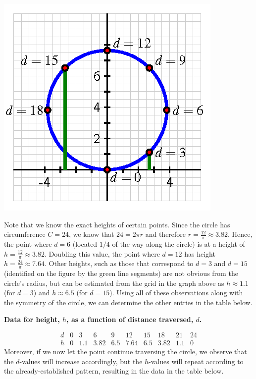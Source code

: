 \documentclass[nooutcomes, noauthor]{ximera}
\begin{document}
\begin{image}
\includegraphics{traversing-first-example.png}
\end{image}

Note that we know the exact heights of certain points.  Since the circle has circumference \(C = 24\), we know that \(24 = 2\pi r\) and therefore \(r = \frac{12}{\pi} \approx 3.82\).  Hence, the point where \(d = 6\) (located \(1/4\) of the way along the circle) is at a height of \(h = \frac{12}{\pi} \approx 3.82\).  Doubling this value, the point where \(d = 12\) has height \(h = \frac{24}{\pi} \approx 7.64\).  Other heights, such as those that correspond to \(d = 3\) and \(d = 15\) (identified on the figure by the green line segments) are not obvious from the circle's radius, but can be estimated from the grid in the graph above as \(h \approx 1.1\) (for \(d = 3\)) and \(h \approx 6.5\) (for \(d = 15\)).  Using all of these observations along with the symmetry of the circle, we can determine the other entries in the table below.

\begin{center}
\textbf{Data for height, \(h\), as a function of distance traversed, \(d\).}
\end{center}
$$
\begin{array}{cccccccccc}
d&0&3&6&9&12&15&18&21&24\\
\hline
h&0&1.1&3.82&6.5&7.64&6.5&3.82&1.1&0
\end{array}
$$
Moreover, if we now let the point continue traversing the circle, we observe that the \(d\)-values will increase accordingly, but the \(h\)-values will repeat according to the already-established pattern, resulting in the data in the table below.
\end{document}
